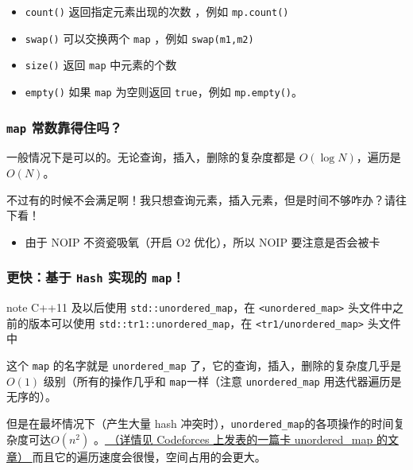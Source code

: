 \begin{itemize}
\item \texttt{count()} 返回指定元素出现的次数 ，例如 \texttt{mp.count()}
\item \texttt{swap()} 可以交换两个 \texttt{map} ，例如 \texttt{swap(m1,m2)}
\item \texttt{size()} 返回 \texttt{map} 中元素的个数
\item \texttt{empty()} 如果 \texttt{map} 为空则返回 \texttt{true}，例如 \texttt{mp.empty()}。
\end{itemize}

\subsubsection{\texttt{map} 常数靠得住吗？}

一般情况下是可以的。无论查询，插入，删除的复杂度都是 $O(\log N)$，遍历是 $O(N)$。

不过有的时候不会满足啊！我只想查询元素，插入元素，但是时间不够咋办？请往下看！

\begin{itemize}
\item 由于 NOIP 不资瓷吸氧（开启 O2 优化），所以 NOIP 要注意是否会被卡
\end{itemize}

\subsubsection{更快：基于 \texttt{Hash} 实现的 \texttt{map}！}

\begin{NOTE}{note}{}
C++11 及以后使用 \texttt{std::unordered_map}，在 \texttt{<unordered_map>} 头文件中之前的版本可以使用 \texttt{std::tr1::unordered_map}，在 \texttt{<tr1/unordered_map>} 头文件中
\end{NOTE}


这个 \texttt{map} 的名字就是 \texttt{unordered_map} 了，它的查询，插入，删除的复杂度几乎是 $O(1)$ 级别（所有的操作几乎和 \texttt{map}一样（注意 \texttt{unordered_map} 用迭代器遍历是无序的）。

但是在最坏情况下（产生大量 hash 冲突时），\texttt{unordered_map}的各项操作的时间复杂度可达$O(n^2)$ 。\href{http://codeforces.com/blog/entry/62393}{ （详情见 Codeforces 上发表的一篇卡 unordered\_map 的文章） } 而且它的遍历速度会很慢，空间占用的会更大。
